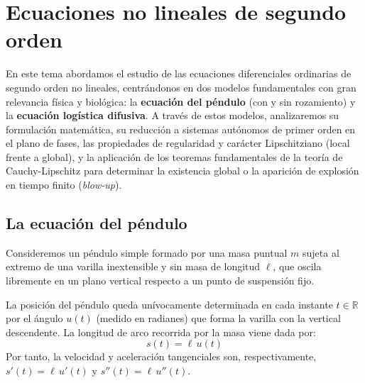 \section{Ecuaciones no lineales de segundo orden}

En este tema abordamos el estudio de las ecuaciones diferenciales ordinarias de segundo orden no lineales, centrándonos en dos modelos fundamentales con gran relevancia física y biológica: la \textbf{ecuación del péndulo} (con y sin rozamiento) y la \textbf{ecuación logística difusiva}. A través de estos modelos, analizaremos su formulación matemática, su reducción a sistemas autónomos de primer orden en el plano de fases, las propiedades de regularidad y carácter Lipschitziano (local frente a global), y la aplicación de los teoremas fundamentales de la teoría de Cauchy-Lipschitz para determinar la existencia global o la aparición de explosión en tiempo finito (\textit{blow-up}).

\subsection{La ecuación del péndulo}

Consideremos un péndulo simple formado por una masa puntual $m$ sujeta al extremo de una varilla inextensible y sin masa de longitud $\ell$, que oscila libremente en un plano vertical respecto a un punto de suspensión fijo.

La posición del péndulo queda unívocamente determinada en cada instante $t \in \mathbb{R}$ por el ángulo $u(t)$ (medido en radianes) que forma la varilla con la vertical descendente. La longitud de arco recorrida por la masa viene dada por:
\[
    s(t) = \ell \, u(t)
\]
Por tanto, la velocidad y aceleración tangenciales son, respectivamente, $s'(t) = \ell \, u'(t)$ y $s''(t) = \ell \, u''(t)$.

